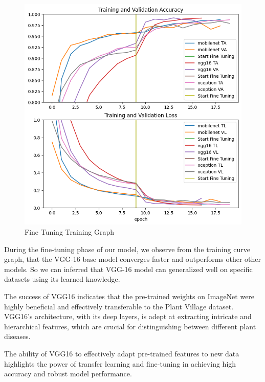 \begin{figure}
    \centering
    \includegraphics[width=1\linewidth]{graphics//chapter5/fine tuning training graph.png}
    \caption{Fine Tuning Training Graph}
    \label{fig:fine-tuning-training}
\end{figure}


During the fine-tuning phase of our model, we observe from the training curve graph, that the VGG-16 base model converges faster and outperforms other other models. So we can inferred that VGG-16 model can generalized well on specific datasets using its learned knowledge. \par\vspace{1em}

The success of VGG16 indicates that the pre-trained weights on ImageNet were highly beneficial and effectively transferable to the Plant Village dataset. VGG16’s architecture, with its deep layers, is adept at extracting intricate and hierarchical features, which are crucial for distinguishing between different plant diseases.\par\vspace{1em}

 The ability of VGG16 to effectively adapt pre-trained features to new data highlights the power of transfer learning and fine-tuning in achieving high accuracy and robust model performance. \par\vspace{1em}
 

